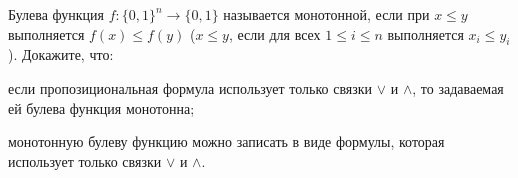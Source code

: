 Булева функция $f\colon \{0, 1\}^n \to \{0, 1\}$ называется монотонной, если при $x \le y$ выполняется
$f(x) \le f(y)$ ($x \le y$, если для всех $1 \le i \le n$ выполняется $x_i \le y_i$). Докажите, что:
\begin{enumcyr}
    \item если пропозициональная формула использует только связки $\lor$ и $\land$, то задаваемая ей
        булева функция монотонна;
    \item монотонную булеву функцию можно записать в виде формулы, которая использует только связки
        $\lor$ и $\land$.
\end{enumcyr}